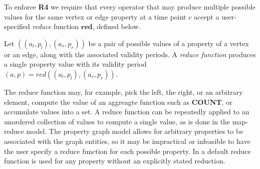 To enforce {\bf R4} we require that every operator that may produce
multiple possible values for the same vertex or edge property at a
time point $c$ accept a user-specified {\em reduce} function
$\mathbf{red}$, defined below.


\begin{definition}
Let $((a_l,p_l),(a_r,p_r))$ be a pair of possible values of a property
of a vertex or an edge, along with the associated validity periods.  A
{\em reduce function} produces a single property value with its
validity period $(a,p) = red((a_l,p_l), (a_r,p_r))$.
\end{definition}

The reduce function may, for example, pick the left, the right, or an
arbitrary element, compute the value of an aggreagte function such as
$\mathbf{COUNT}$, or accumulate values into a set.  A reduce function
can be repeatedly applied to an unordered collection of values to
compute a single value, as is done in the map-reduce model.  The
property graph model allows for arbitrary properties to be associated
with the graph entities, so it may be impractical or infeasible to
have the user specify a reduce function for each possible property.
In \ql a default reduce function  is used for any property
without an explicitly stated reduction.



